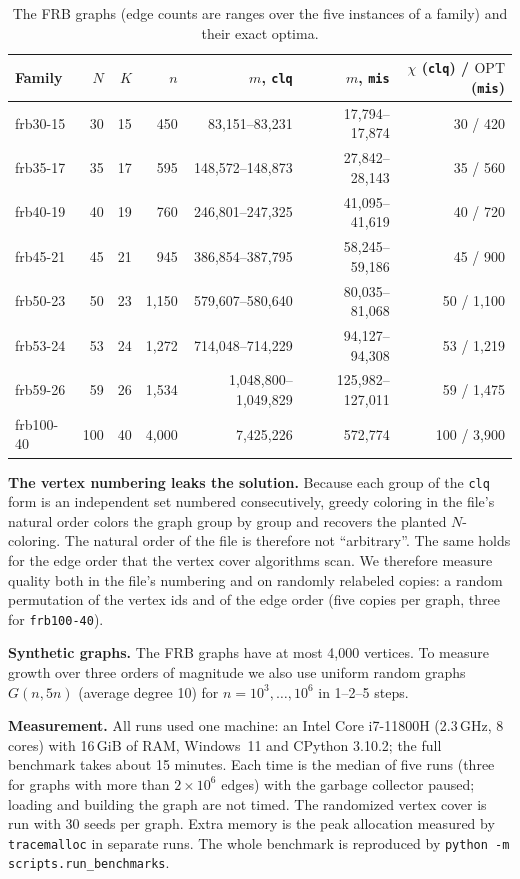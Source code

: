 \documentclass[acmsmall,nonacm]{acmart}
\newcommand{\code}[1]{\texttt{#1}}
\newcommand{\OPT}{\mathrm{OPT}}
\begin{document}
\begin{table}[t]
\caption{The FRB graphs (edge counts are ranges over the five instances of a family) and their exact optima.}
\label{tab:dataset}
\small
\begin{tabular}{@{}lrrrrrr@{}}
\toprule
Family & $N$ & $K$ & $n$ & $m$, \code{clq} & $m$, \code{mis} & $\chi$ (\code{clq}) / $\OPT$ (\code{mis}) \\
\midrule
frb30-15 & 30 & 15 & 450 & 83,151--83,231 & 17,794--17,874 & 30 / 420 \\
frb35-17 & 35 & 17 & 595 & 148,572--148,873 & 27,842--28,143 & 35 / 560 \\
frb40-19 & 40 & 19 & 760 & 246,801--247,325 & 41,095--41,619 & 40 / 720 \\
frb45-21 & 45 & 21 & 945 & 386,854--387,795 & 58,245--59,186 & 45 / 900 \\
frb50-23 & 50 & 23 & 1,150 & 579,607--580,640 & 80,035--81,068 & 50 / 1,100 \\
frb53-24 & 53 & 24 & 1,272 & 714,048--714,229 & 94,127--94,308 & 53 / 1,219 \\
frb59-26 & 59 & 26 & 1,534 & 1,048,800--1,049,829 & 125,982--127,011 & 59 / 1,475 \\
frb100-40 & 100 & 40 & 4,000 & 7,425,226 & 572,774 & 100 / 3,900 \\
\bottomrule
\end{tabular}
\end{table}

\textbf{The vertex numbering leaks the solution.}
\label{sec:numbering}
Because each group of the \code{clq} form is an independent set numbered
consecutively, greedy coloring in the file's natural order colors the graph
group by group and recovers the planted $N$-coloring. The natural order of the
file is therefore not ``arbitrary''. The same holds for the edge order that the
vertex cover algorithms scan. We therefore measure quality both in the file's
numbering and on randomly relabeled copies: a random permutation of the vertex
ids and of the edge order (five copies per graph, three for \code{frb100-40}).

\textbf{Synthetic graphs.} The FRB graphs have at most 4,000 vertices. To
measure growth over three orders of magnitude we also use uniform random graphs
$G(n,5n)$ (average degree 10) for $n=10^3,\ldots,10^6$ in 1--2--5 steps.

\textbf{Measurement.}
All runs used one machine: an Intel Core i7-11800H (2.3\,GHz, 8 cores) with 16\,GiB of RAM, Windows~11 and CPython 3.10.2; the full benchmark takes about 15 minutes.
Each time is the median of five runs (three for graphs with more than
$2\times10^6$ edges) with the garbage collector paused; loading and building
the graph are not timed. The randomized vertex cover is run with 30 seeds per
graph. Extra memory is the peak allocation measured by \code{tracemalloc} in
separate runs. The whole benchmark is reproduced by
\code{python -m scripts.run\_benchmarks}.
\end{document}
